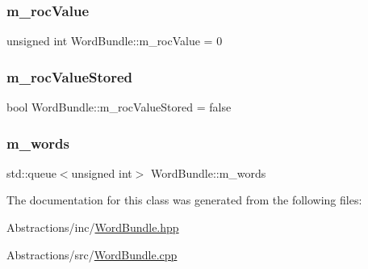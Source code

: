 \mbox{\label{class_word_bundle_a2510a567b83584e8b53395168d53c401}} 
\subsubsection{\texorpdfstring{m\+\_\+roc\+Value}{m\_rocValue}}
{\footnotesize\ttfamily unsigned int Word\+Bundle\+::m\+\_\+roc\+Value = 0\hspace{0.3cm}{\ttfamily [private]}}

\mbox{\label{class_word_bundle_a7605157c872054d7ab42b590fac97ca7}} 
\subsubsection{\texorpdfstring{m\+\_\+roc\+Value\+Stored}{m\_rocValueStored}}
{\footnotesize\ttfamily bool Word\+Bundle\+::m\+\_\+roc\+Value\+Stored = false\hspace{0.3cm}{\ttfamily [private]}}

\mbox{\label{class_word_bundle_a58233a5455b9a594e3441dd79e3d6a3b}} 
\subsubsection{\texorpdfstring{m\+\_\+words}{m\_words}}
{\footnotesize\ttfamily std\+::queue$<$unsigned int$>$ Word\+Bundle\+::m\+\_\+words\hspace{0.3cm}{\ttfamily [private]}}



The documentation for this class was generated from the following files\+:\begin{DoxyCompactItemize}
\item 
Abstractions/inc/\hyperlink{_word_bundle_8hpp}{Word\+Bundle.\+hpp}\item 
Abstractions/src/\hyperlink{_word_bundle_8cpp}{Word\+Bundle.\+cpp}\end{DoxyCompactItemize}

